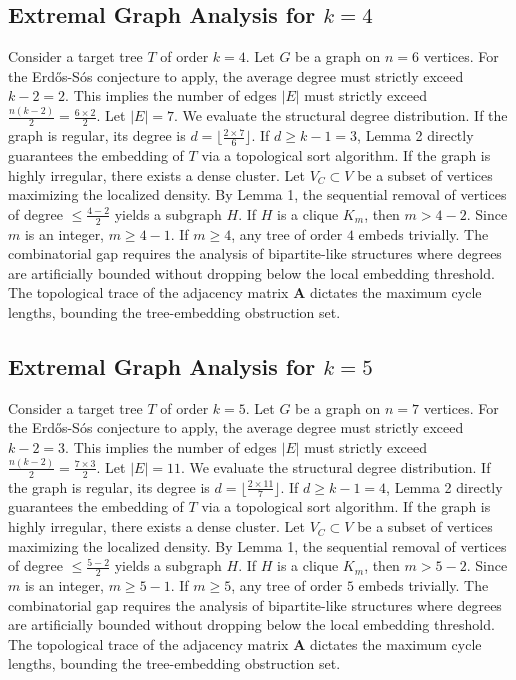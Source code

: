 \documentclass[11pt,a4paper]{article}
\begin{document}
\subsection{Extremal Graph Analysis for $k=4$}
Consider a target tree $T$ of order $k=4$.
Let $G$ be a graph on $n=6$ vertices.
For the Erd\H{o}s-S\'os conjecture to apply, the average degree must strictly exceed $k-2 = 2$.
This implies the number of edges $|E|$ must strictly exceed $\frac{n(k-2)}{2} = \frac{6 \times 2}{2}$.
Let $|E| = 7$.
We evaluate the structural degree distribution. If the graph is regular, its degree is $d = \lfloor \frac{2 \times 7}{6} \rfloor$.
If $d \geq k-1 = 3$, Lemma 2 directly guarantees the embedding of $T$ via a topological sort algorithm.
If the graph is highly irregular, there exists a dense cluster. Let $V_C \subset V$ be a subset of vertices maximizing the localized density.
By Lemma 1, the sequential removal of vertices of degree $\leq \frac{4-2}{2}$ yields a subgraph $H$.
If $H$ is a clique $K_{m}$, then $m > 4-2$. Since $m$ is an integer, $m \geq 4-1$. If $m \geq 4$, any tree of order $4$ embeds trivially.
The combinatorial gap requires the analysis of bipartite-like structures where degrees are artificially bounded without dropping below the local embedding threshold. The topological trace of the adjacency matrix $\mathbf{A}$ dictates the maximum cycle lengths, bounding the tree-embedding obstruction set.


\subsection{Extremal Graph Analysis for $k=5$}
Consider a target tree $T$ of order $k=5$.
Let $G$ be a graph on $n=7$ vertices.
For the Erd\H{o}s-S\'os conjecture to apply, the average degree must strictly exceed $k-2 = 3$.
This implies the number of edges $|E|$ must strictly exceed $\frac{n(k-2)}{2} = \frac{7 \times 3}{2}$.
Let $|E| = 11$.
We evaluate the structural degree distribution. If the graph is regular, its degree is $d = \lfloor \frac{2 \times 11}{7} \rfloor$.
If $d \geq k-1 = 4$, Lemma 2 directly guarantees the embedding of $T$ via a topological sort algorithm.
If the graph is highly irregular, there exists a dense cluster. Let $V_C \subset V$ be a subset of vertices maximizing the localized density.
By Lemma 1, the sequential removal of vertices of degree $\leq \frac{5-2}{2}$ yields a subgraph $H$.
If $H$ is a clique $K_{m}$, then $m > 5-2$. Since $m$ is an integer, $m \geq 5-1$. If $m \geq 5$, any tree of order $5$ embeds trivially.
The combinatorial gap requires the analysis of bipartite-like structures where degrees are artificially bounded without dropping below the local embedding threshold. The topological trace of the adjacency matrix $\mathbf{A}$ dictates the maximum cycle lengths, bounding the tree-embedding obstruction set.
\end{document}
